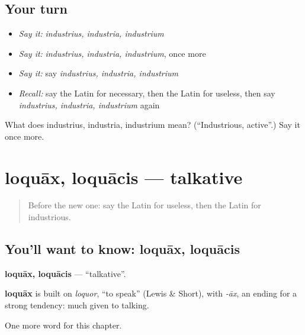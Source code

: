 \subsection*{Your turn}
\begin{itemize}
\raggedright
  \item \emph{Say it:} \emph{industrius, industria, industrium}
  \item \emph{Say it:} \emph{industrius, industria, industrium}, once more
  \item \emph{Say it:} say \emph{industrius, industria, industrium}
  \item \emph{Recall:} say the Latin for necessary, then the Latin for useless, then say \emph{industrius, industria, industrium} again
\end{itemize}

\begin{tcolorbox}[breakable,colback=teal!4,colframe=teal!35!black,title={Before you move on}]
What does industrius, industria, industrium mean? (\textquotedblleft{}Industrious, active\textquotedblright{}.) Say it once more.
\end{tcolorbox}
\section[loquāx, loquācis]{loquāx, loquācis — talkative}

\label{lesson:LA-C241-loquax}



\begin{quote}
Before the new one: say the Latin for useless, then the Latin for industrious.
\end{quote}

\subsection*{You'll want to know: loquāx, loquācis}
\textbf{loquāx, loquācis} — \textquotedblleft{}talkative\textquotedblright{}.

\begin{cousinweb}
\textbf{loquāx} is built on \emph{loquor}, \textquotedblleft{}to speak\textquotedblright{} (Lewis \& Short), with \emph{-āx}, an ending for a strong tendency: much given to talking.
\end{cousinweb}

\begin{grammarlens}[title={What you've built}]
One more word for this chapter.
\end{grammarlens}

